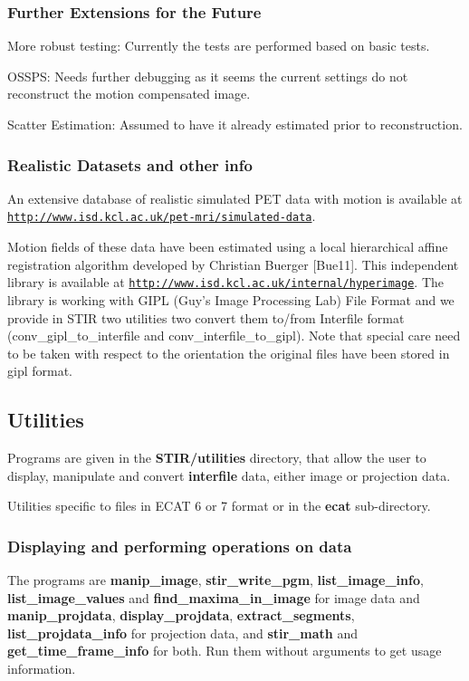\documentclass{article}
\def\url#1#2{\mbox{\href{#1}{\tt #2}}}
\begin{document}
\subsubsection{Further Extensions for the Future}
More robust testing: Currently the tests are performed based on basic tests.

OSSPS: Needs further debugging as it seems the current settings do not reconstruct the
motion compensated image. 

Scatter Estimation: Assumed to have it already estimated prior to reconstruction. 

\subsubsection{Realistic Datasets and other info}
An extensive
database of realistic simulated PET data with motion is available at\\
\url{http://www.isd.kcl.ac.uk/pet-mri/simulated-data/}{http://www.isd.kcl.ac.uk/pet-mri/simulated-data}. 

Motion fields of these data have been estimated using a local hierarchical affine
registration algorithm developed by Christian Buerger [Bue11]. This independent
library is available at
\url{http://www.isd.kcl.ac.uk/internal/hyperimage}{http://www.isd.kcl.ac.uk/internal/hyperimage}. 
The library is working with GIPL (Guy's Image Processing Lab) File Format and we provide in STIR two utilities two convert
them to/from Interfile format (conv\_gipl\_to\_interfile and
conv\_interfile\_to\_gipl). Note that special care need to be taken with respect
to the orientation the original files have been stored in gipl format. 


\subsection{
Utilities}

Programs are given in the \textbf{STIR/utilities} directory, that 
allow the user to display, manipulate and convert \textbf{interfile} 
data, either image or projection data.

Utilities specific to files in ECAT 6 or 7 format or in the \textbf{ecat}
sub-directory.

\subsubsection{
Displaying and performing operations on data}

The programs are \textbf{manip\_image}, \textbf{stir\_write\_pgm}, \textbf{list\_image\_info}, 
\textbf{list\_image\_values} and \textbf{find\_maxima\_in\_image}
for image data and \textbf{manip\_projdata}, 
 \textbf{display\_projdata}, \textbf{extract\_segments}, 
\textbf{list\_projdata\_info} for 
projection data, and \textbf{stir\_math} and \textbf{get\_time\_frame\_info} for both.
Run them without arguments to get usage information.
\end{document}
